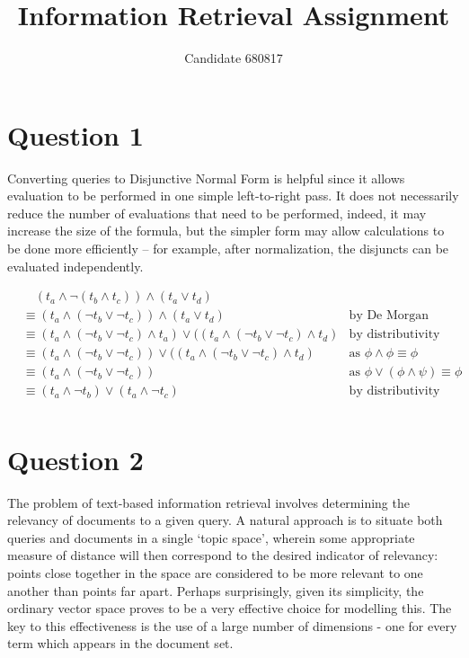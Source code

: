 \documentclass[11pt]{article}
\begin{document}
\title{Information Retrieval Assignment}
\author{Candidate 680817}
\maketitle

\section*{Question 1}
Converting queries to Disjunctive Normal Form is helpful since it allows
evaluation to be performed in one simple left-to-right pass.  It does not
necessarily reduce the number of evaluations that need to be performed, indeed,
it may increase the size of the formula, but the simpler form may allow
calculations to be done more efficiently -- for example, after normalization,
the disjuncts can be evaluated independently. 

\begin{align*}
& \quad (t_a \wedge \neg (t_b \wedge t_c)) \wedge (t_a \vee t_d)                                                   & \\
& \equiv (t_a \wedge (\neg t_b \vee \neg t_c)) \wedge (t_a \vee t_d)                                               & \text{by De Morgan} \\
& \equiv (t_a \wedge (\neg t_b \vee \neg t_c) \wedge t_a) \vee ( (t_a \wedge (\neg t_b \vee \neg t_c) \wedge t_d ) & \text{by distributivity} \\
& \equiv (t_a \wedge (\neg t_b \vee \neg t_c)) \vee ( (t_a \wedge (\neg t_b \vee \neg t_c) \wedge t_d ) & \text{as } \phi \wedge \phi \equiv \phi \\
& \equiv (t_a \wedge (\neg t_b \vee \neg t_c)) & \text{as } \phi \vee (\phi \wedge \psi) \equiv \phi \\
& \equiv (t_a \wedge \neg t_b) \vee (t_a \wedge \neg t_c) & \text{by distributivity} \\
\end{align*}

\section*{Question 2}
The problem of text-based information retrieval involves determining the
relevancy of documents to a given query. A natural approach is to situate both
queries and documents in a single `topic space', wherein some appropriate
measure of distance will then correspond to the desired indicator of relevancy:
points close together in the space are considered to be more relevant to
one another than points far apart. Perhaps surprisingly, given its simplicity,
the ordinary vector space proves to be a very effective choice for modelling
this. The key to this effectiveness is the use of a large number of dimensions
- one for every term which appears in the document set.
\end{document}
